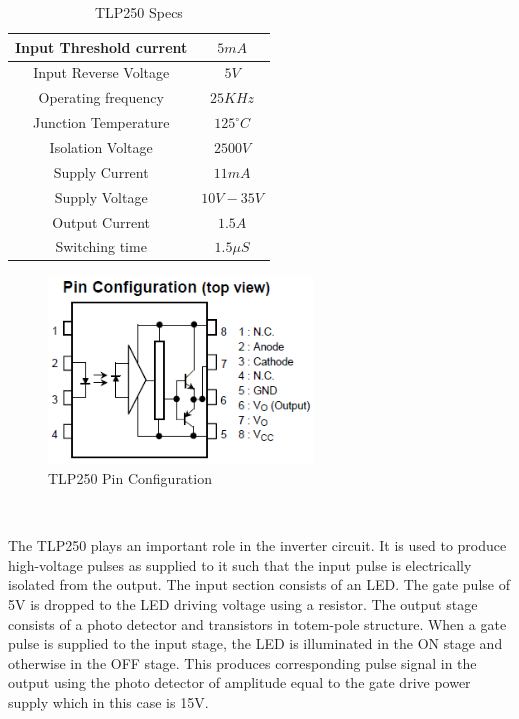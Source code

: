 \documentclass[12pt,a4paper]{report}
\begin{document}
\noindent\begin{minipage}{9cm}
	\begin{table}[H]
		\begin{center}
			\begin{tabular}{|c|c|} 
				\hline
				Input Threshold current & $5mA$\\ 
				\hline
				Input Reverse Voltage & $5V$\\ 
				\hline
				Operating frequency & $25KHz$\\ 
				\hline
				Junction Temperature & $125^{\circ}C$\\ 
				\hline
				Isolation Voltage & $2500V$\\ 
				\hline
				Supply Current & $11mA$\\ 
				\hline
				Supply Voltage & $10V-35V$\\
				\hline
				Output Current & $1.5A$\\
				\hline
				Switching time & $1.5\mu S$\\
				\hline
			\end{tabular}
		\end{center}
		\caption{TLP250 Specs}
	\end{table}
\end{minipage}
\begin{minipage}{5cm}
	\begin{figure}[H]
		\begin{center}
			\includegraphics[width=7cm,height=5cm]{figures/tlp.png}
		\end{center}
		\caption{TLP250 Pin Configuration}
	\end{figure}
\end{minipage}\\ \vspace{0.1in}

The TLP250 plays an important role in the inverter circuit. It is used to produce high-voltage pulses as supplied to it such that the input pulse is electrically isolated from the output. The input section consists of an LED. The gate pulse of 5V is dropped to the LED driving voltage using a resistor. The output stage consists of a photo detector and transistors in totem-pole structure. When a gate pulse is supplied to the input stage, the LED is illuminated in the ON stage and otherwise in the OFF stage. This produces corresponding pulse signal in the output using the photo detector of amplitude equal to the gate drive power supply which in this case is 15V.\\
\end{document}
